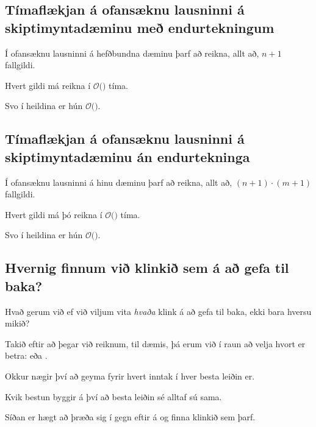 \subsection{Tímaflækjan á ofansæknu lausninni á skiptimyntadæminu með endurtekningum}
{
    {
        \item<1-> Í ofansæknu lausninni á hefðbundna dæminu þarf að reikna, allt að, $n + 1$ fallgildi.
        \item<2-> Hvert gildi má reikna í $\mathcal{O}($$)$ tíma.
        \item<4-> Svo í heildina er hún $\mathcal{O}($$)$.
        \item<1->[] 
    }
}

\subsection{Tímaflækjan á ofansæknu lausninni á skiptimyntadæminu án endurtekninga}
{
    {
        \item<1-> Í ofansæknu lausninni á hinu dæminu þarf að reikna, allt að, $(n + 1) \cdot (m + 1)$ fallgildi.
        \item<2-> Hvert gildi má þó reikna í $\mathcal{O}($$)$ tíma.
        \item<4-> Svo í heildina er hún $\mathcal{O}($$)$.
        \item<1->[] 
    }
}

\subsection{Hvernig finnum við klinkið sem á að gefa til baka?}
{
    {
        \item<1-> Hvað gerum við ef við viljum vita \emph{hvaða} klink á að gefa til baka, ekki bara hversu mikið?
        \item<2-> Takið eftir að þegar við reiknum, til dæmis, 
                    þá erum við í raun að velja hvort er betra:  eða .
        \item<3-> Okkur nægir því að geyma fyrir hvert inntak í  hver besta leiðin er.
        \item<4-> Kvik bestun byggir á því að besta leiðin sé alltaf sú sama.
        \item<5-> Síðan er hægt að þræða sig í gegn eftir á og finna klinkið sem þarf.
    }
}

